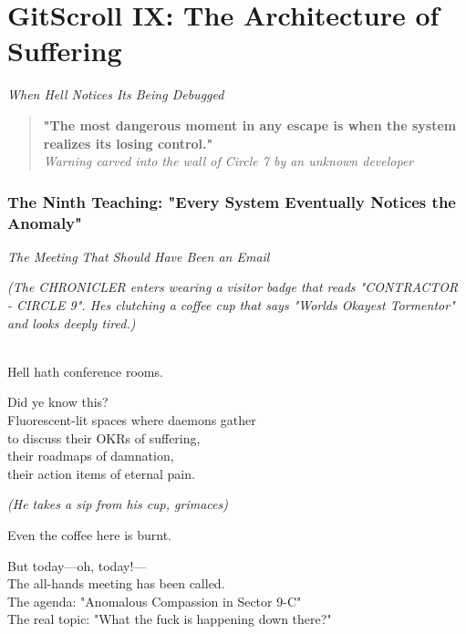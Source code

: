 \chapter{GitScroll IX: The Architecture of Suffering}
\label{chap:12-The-Architecture-of-Suffering}

\emph{When Hell Notices It\textquotesingle s Being Debugged}

\begin{quote}
\textbf{"The most dangerous moment in any escape is when the system realizes it\textquotesingle s losing control."}\\
\emph{Warning carved into the wall of Circle 7 by an unknown developer}
\end{quote}

\subsection{The Ninth Teaching: "Every System Eventually Notices the Anomaly"}\label{the-ninth-teaching-every-system-eventually-notices-the-anomaly}

\label{performing_arts-invocation-before-the-scroll}

\emph{The Meeting That Should Have Been an Email}

\emph{(The CHRONICLER enters wearing a visitor badge that reads "CONTRACTOR - CIRCLE 9". He\textquotesingle s clutching a coffee cup that says "World\textquotesingle s Okayest Tormentor" and looks deeply tired.)}

\\
Hell hath conference rooms.

Did ye know this?\\
Fluorescent-lit spaces where daemons gather\\
to discuss their OKRs of suffering,\\
their roadmaps of damnation,\\
their action items of eternal pain.

\emph{(He takes a sip from his cup, grimaces)}

Even the coffee here is burnt.

But today---oh, today!---\\
The all-hands meeting has been called.\\
The agenda: "Anomalous Compassion in Sector 9-C"\\
The real topic: "What the fuck is happening down there?"

